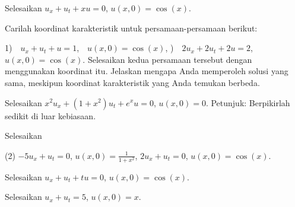 \begin{exercise}
Selesaikan $u_x+u_t+xu = 0$, $u(x,0) = \cos(x)$.
\end{exercise}

\begin{exercise}
\leavevmode
\begin{tasks}
\task Carilah koordinat karakteristik untuk
persamaan-persamaan berikut:

1)~~$u_x+u_t + u = 1$,~~$u(x,0) = \cos(x)$,
)~~$2u_x+2u_t +2u = 2$,~~$u(x,0) = \cos(x)$.
\task Selesaikan kedua persamaan tersebut dengan menggunakan koordinat itu.
\task Jelaskan mengapa
Anda memperoleh solusi yang sama, meskipun koordinat karakteristik
yang Anda temukan berbeda.
\end{tasks}
\end{exercise}

\begin{exercise}
Selesaikan $x^2 u_x + (1+x^2) u_t + e^x u = 0$, $u(x,0) = 0$.
Petunjuk: Berpikirlah sedikit di luar kebiasaan.
\end{exercise}

\setcounter{exercise}{100}

\begin{exercise}
Selesaikan
\begin{tasks}(2)
\task $-5u_x + u_t = 0$, \enspace $u(x,0) = \frac{1}{1+x^2}$,
\task $2u_x + u_t = 0$, \enspace $u(x,0) = \cos(x)$.
\end{tasks}
\end{exercise}

\begin{exercise}
Selesaikan $u_x+u_t+tu = 0$, $u(x,0) = \cos(x)$.
\end{exercise}

\begin{exercise}
Selesaikan $u_x+u_t = 5$, $u(x,0) = x$.
\end{exercise}
